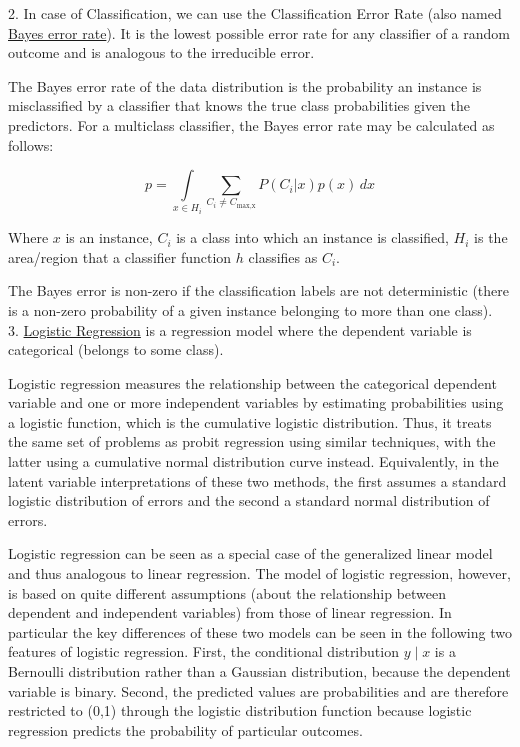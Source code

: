 \documentclass[a4paper,12pt,titlepage]{article} %
\begin{document}
2. In case of Classification, we can use the Classification Error Rate (also named \underline{Bayes error rate}). It is the lowest possible error rate for any classifier of a random outcome and is analogous to the irreducible error.

The Bayes error rate of the data distribution is the probability an instance is misclassified by a classifier that knows the true class probabilities given the predictors. For a multiclass classifier, the Bayes error rate may be calculated as follows:

$$ p = \int \limits _{x \in H_{i}} \sum _{C_{i} \neq C_{\text{max,x}}} { P(C_{i}|x)p(x)\,dx}  $$

Where $ x $ is an instance, $ C_{i} $ is a class into which an instance is classified, $ H_{i} $ is the area/region that a classifier function $ h $ classifies as $ C_{i}$. 

The Bayes error is non-zero if the classification labels are not deterministic (there is a non-zero probability of a given instance belonging to more than one class).\\

3. \underline{Logistic Regression} is a regression model where the dependent variable is categorical (belongs to some class). 

Logistic regression measures the relationship between the categorical dependent variable and one or more independent variables by estimating probabilities using a logistic function, which is the cumulative logistic distribution. Thus, it treats the same set of problems as probit regression using similar techniques, with the latter using a cumulative normal distribution curve instead. Equivalently, in the latent variable interpretations of these two methods, the first assumes a standard logistic distribution of errors and the second a standard normal distribution of errors.

Logistic regression can be seen as a special case of the generalized linear model and thus analogous to linear regression. The model of logistic regression, however, is based on quite different assumptions (about the relationship between dependent and independent variables) from those of linear regression. In particular the key differences of these two models can be seen in the following two features of logistic regression. First, the conditional distribution $ y\mid x $ is a Bernoulli distribution rather than a Gaussian distribution, because the dependent variable is binary. Second, the predicted values are probabilities and are therefore restricted to (0,1) through the logistic distribution function because logistic regression predicts the probability of particular outcomes.
\end{document}
